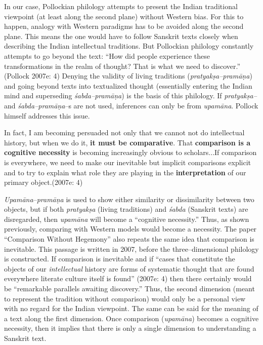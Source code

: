 In our case, Pollockian philology attempts to present the Indian traditional viewpoint (at least along the second plane) without Western bias. For this to happen, analogy with Western paradigms has to be avoided along the second plane. This means the one would have to follow Sanskrit texts closely when describing the Indian intellectual traditions. But Pollockian philology constantly attempts to go beyond the text: “How did people experience these transformations in the realm of thought? That is what we need to discover.” (Pollock 2007e: 4) Denying the validity of living traditions (\textit{pratyakṣa–pramāṇa}) and going beyond texts into textualized thought (essentially entering the Indian mind and superseding \textit{śabda–pramāṇa}) is the basis of this philology. If \textit{pratyakṣa– }and \textit{śabda–pramāṇa}–s are not used, inferences can only be from \textit{upamāna}. Pollock himself addresses this issue.

\begin{myquote}
In fact, I am becoming persuaded not only that we cannot not do intellectual history, but when we do it, \textbf{it must be comparative}. That \textbf{comparison is a cognitive necessity} is becoming increasingly obvious to scholars...If comparison is everywhere, we need to make our inevitable but implicit comparisons explicit and to try to explain what role they are playing in the \textbf{interpretation} of our primary object.(2007e: 4)
\end{myquote}

\textit{Upamāna}–\textit{pramāṇa }is used to show either similarity or dissimilarity between two objects, but if both \textit{pratyakṣa }(living traditions) and \textit{śabda }(Sanskrit texts) are disregarded, then \textit{upamāna }will become a “cognitive necessity.” Thus, as shown previously, comparing with Western models would become a necessity. The paper “Comparison Without Hegemony” also repeats the same idea that comparison is inevitable. This passage is written in 2007, before the three–dimensional philology is constructed. If comparison is inevitable and if “cases that constitute the objects of our \textit{intellectual} history are forms of systematic thought that are found everywhere literate culture itself is found” (2007e: 4) then there certainly would be “remarkable parallels awaiting discovery.” Thus, the second dimension (meant to represent the tradition without comparison) would only be a personal view with no regard for the Indian viewpoint. The same can be said for the meaning of a text along the first dimension. Once comparison (\textit{upamāna}) becomes a cognitive necessity, then it implies that there is only a single dimension to understanding a Sanskrit text.

